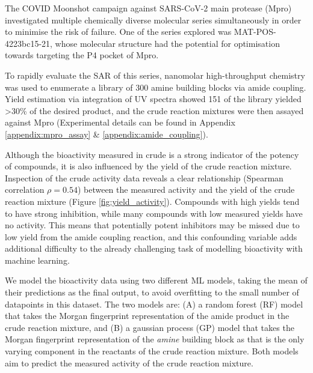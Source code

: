 The COVID Moonshot campaign \cite{Moonshot2022} against SARS-CoV-2 main protease (Mpro) investigated multiple chemically diverse molecular series simultaneously in order to minimise the risk of failure. One of the series explored was MAT-POS-4223bc15-21, whose molecular structure had the potential for optimisation towards targeting the P4 pocket of Mpro. 

To rapidly evaluate the SAR of this series, nanomolar high-throughput chemistry was used to enumerate a library of 300 amine building blocks via amide coupling. Yield estimation via integration of UV spectra showed 151 of the library yielded >30\% of the desired product, and the crude reaction mixtures were then assayed against Mpro (Experimental details can be found in Appendix \ref{appendix:mpro_assay} \& \ref{appendix:amide_coupling}).

Although the bioactivity measured in crude is a strong indicator of the potency of compounds, it is also influenced by the yield of the crude reaction mixture. Inspection of the crude activity data reveals a clear relationship (Spearman correlation $\rho = 0.54$) between the measured activity and the yield of the crude reaction mixture (Figure \ref{fig:yield_activity}). Compounds with high yields tend to have strong inhibition, while many compounds with low measured yields have no activity. This means that potentially potent inhibitors may be missed due to low yield from the amide coupling reaction, and this confounding variable adds additional difficulty to the already challenging task of modelling bioactivity with machine learning. 

We model the bioactivity data using two different ML models, taking the mean of their predictions as the final output, to avoid overfitting to the small number of datapoints in this dataset. The two models are: (A) a random forest (RF) model that takes the Morgan fingerprint representation of the amide product in the crude reaction mixture, and (B) a gaussian process (GP) model that takes the Morgan fingerprint representation of the \textit{amine} building block as that is the only varying component in the reactants of the crude reaction mixture. Both models aim to predict the measured activity of the crude reaction mixture.

